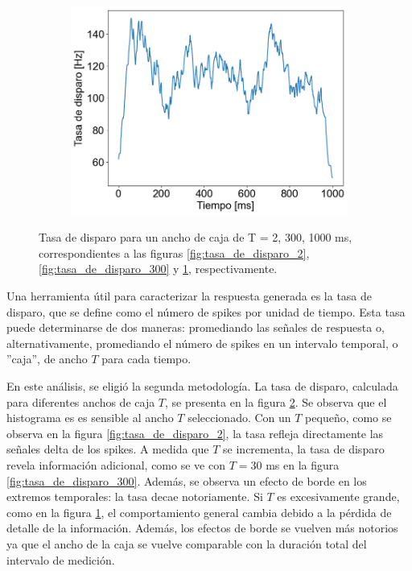 \documentclass[aps,prb,twocolumn,superscriptaddress,floatfix,longbibliography]{revtex4-2}
\newcounter{para}
\begin{document}
\begin{figure}
\begin{subfigure}[b]{0.3\textwidth}
      \includegraphics[width=\textwidth]{tasa_de_disparo_1000.png}
      \caption{\label{fig:tasa_de_disparo_1000}}
  \end{subfigure}
     \caption{Tasa de disparo para un ancho de caja de T = 2, 300, 1000 ms, correspondientes a las figuras \ref{fig:tasa_de_disparo_2}, \ref{fig:tasa_de_disparo_300} y \ref{fig:tasa_de_disparo_1000}, respectivamente.}
     \label{fig:tasa_de_disparo}
\end{figure}


Una herramienta útil para caracterizar la respuesta generada es la tasa de disparo, que se define como el número de spikes por unidad de tiempo. Esta tasa puede determinarse de dos maneras: promediando las señales de respuesta o, alternativamente, promediando el número de spikes en un intervalo temporal, o ''caja'', de ancho \(T\) para cada tiempo.

En este análisis, se eligió la segunda metodología. La tasa de disparo, calculada para diferentes anchos de caja \(T\), se presenta en la figura \ref{fig:tasa_de_disparo}. Se observa que el histograma es es sensible al ancho \(T\) seleccionado. Con un \(T\) pequeño, como se observa en la figura \ref{fig:tasa_de_disparo_2}, la tasa refleja directamente las señales delta de los spikes. A medida que \(T\) se incrementa, la tasa de disparo revela información adicional, como se ve con \(T = 30\) ms en la figura \ref{fig:tasa_de_disparo_300}. Además, se observa un efecto de borde en los extremos temporales: la tasa decae notoriamente. Si \(T\) es excesivamente grande, como en la figura \ref{fig:tasa_de_disparo_1000}, el comportamiento general cambia debido a la pérdida de detalle de la información. Además, los efectos de borde se vuelven más notorios ya que el ancho de la caja se vuelve comparable con la duración total del intervalo de medición.
\end{document}

